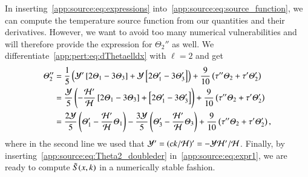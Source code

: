 In inserting~\cref{app:source:eq:expressions} into~\cref{app:source:eq:source_function}, we can compute the temperature source function from our quantities and their derivatives. However, we want to avoid too many numerical vulnerabilities and will therefore provide the expression for $\Theta_2''$ as well. We differentiate~\cref{app:pert:eq:dThetaelldx} with $\ell=2$ and get
\begin{align}\label{app:source:eq:Theta2_doubleder}
    \varTheta_2'' &= \frac{1}{5} \left( \mathcal{Y}' \left[2\varTheta_1 - 3\varTheta_3\right] + \mathcal{Y}\left[2\varTheta_1' - 3\varTheta_3' \right] \right)+ \frac{9}{10} \left(\tau''\varTheta_2 + \tau ' \varTheta_2 ' \right) \nonumber\\
    &= \frac{\mathcal{Y}}{5} \left( -\frac{\mathcal{H}'}{\mathcal{H}}\left[2\varTheta_1 - 3\varTheta_3\right] + \left[2\varTheta_1' - 3\varTheta_3' \right] \right)+ \frac{9}{10} \left(\tau''\varTheta_2 + \tau ' \varTheta_2 ' \right) \nonumber \\
    &=\frac{2\mathcal{Y}}{5} \left(\varTheta_1'-\frac{\mathcal{H}'}{\mathcal{H}}\varTheta_1 \right) - \frac{3\mathcal{Y}}{5} \left(\varTheta_3' -\frac{\mathcal{H}'}{\mathcal{H}}\varTheta_3\right)+\frac{9}{10} \left(\tau''\varTheta_2 + \tau ' \varTheta_2 ' \right),
\end{align}
where in the second line we used that $\mathcal{Y}'=(ck/\mathcal{H})'= -\mathcal{Y} \mathcal{H}'/\mathcal{H}$. Finally, by inserting~\cref{app:source:eq:Theta2_doubleder} in~\cref{app:source:eq:expr1}, we are ready to compute $\tilde{S}(x,k)$ in a numerically stable fashion.



    
